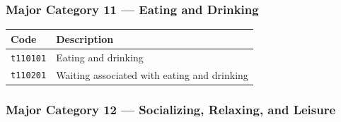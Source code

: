 \documentclass[11pt, a4paper]{article}
\begin{document}
\subsubsection*{Major Category 11 --- Eating and Drinking}
\begin{longtable}{L{3cm} L{13cm}}
\toprule \textbf{Code} & \textbf{Description} \\ \midrule \endhead
\bottomrule \endfoot
\texttt{t110101} & Eating and drinking \\
 \texttt{t110201} & Waiting associated with eating and drinking \\
\end{longtable}

\subsubsection*{Major Category 12 --- Socializing, Relaxing, and Leisure}
\end{document}
